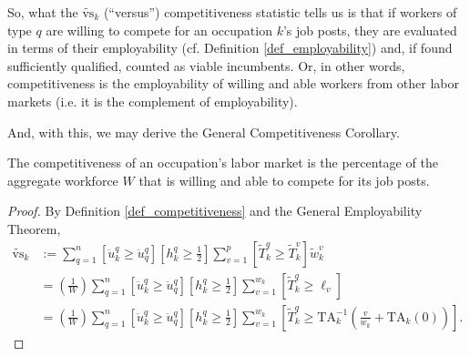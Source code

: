\documentclass[hidelinks, nonatbib]{elsarticle}
\begin{document}
\begin{definition}[Competitiveness]
    So, what the $\tilde{\text{vs}}_{k}$ (``versus'') competitiveness statistic tells us is that if workers of type $q$ are willing to compete for an occupation $k$'s job posts, they are evaluated in terms of their employability (cf. Definition \ref{def_employability}) and, if found sufficiently qualified, counted as viable incumbents. Or, in other words, competitiveness is the employability of willing and able workers from other labor markets (i.e. it is the complement of employability).
\end{definition}

And, with this, we may derive the General Competitiveness Corollary.
\begin{corollary}
    \label{gcc}
    The competitiveness of an occupation's labor market is the percentage of the aggregate workforce $W$ that is willing and able to compete for its job posts.

    \begin{proof}
        By Definition \ref{def_competitiveness} and the General Employability Theorem,
        \begin{align}
            \tilde{\text{vs}}_k 
            &:=
            \sum_{q=1}^{n}
            \left[
                \ddot{u}_{k}^{q}
                \geq
                \ddot{u}_{q}^{q}
            \right]
            \left[
                h_{k}^{q}
                \geq
                \frac{1}{2}
            \right]
            \sum_{v=1}^{p}
            \left[
                \tilde{T}_{k}^{q}
                \geq
                \tilde{T}_{k}^{v}
            \right]
            \tilde{w}_{k}^{v}
            \\
            &=
            \left(
                \frac{1}{W}
            \right)
            \sum_{q=1}^{n}
            \left[
                \ddot{u}_{k}^{q}
                \geq
                \ddot{u}_{q}^{q}
            \right]
            \left[
                h_{k}^{q}
                \geq
                \frac{1}{2}
            \right]
            \sum_{v=1}^{w_k}
            \left[
                \tilde{T}_{k}^{q}
                \geq
                \ell_v
            \right]
            \\
            &=
            \left(
                \frac{1}{W}
            \right)
            \sum_{q=1}^{n}
            \left[
                \ddot{u}_{k}^{q}
                \geq
                \ddot{u}_{q}^{q}
            \right]
            \left[
                h_{k}^{q}
                \geq
                \frac{1}{2}
            \right]
            \sum_{v=1}^{w_k}
            \left[
                \tilde{T}_{k}^{q}
                \geq
                \text{TA}_{k}^{-1}
                \left(
                    \frac{v}{w_k}
                    +
                    \text{TA}_{k}(0)
                \right)
            \right]
            .
        \end{align}
    \end{proof}
\end{corollary}
\end{document}
